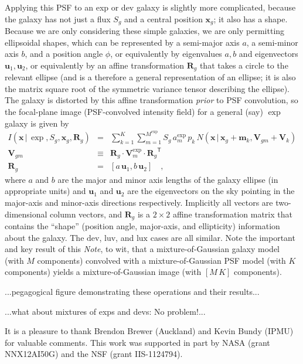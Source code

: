 \documentclass[12pt,pdftex,preprint]{aastex}
\newcommand{\documentname}{\textsl{Note}}
\newcommand{\tmatrix}[1]{\boldsymbol{#1}}
\newcommand{\transpose}[1]{{#1}^{\mathsf T}}
\newcommand{\tvector}[1]{\boldsymbol{#1}}
\newcommand{\pos}{\tvector{x}}
\newcommand{\mean}{\tvector{m}}
\newcommand{\var}{\tmatrix{V}}
\newcommand{\affine}{\tmatrix{R}}
\newcommand{\uv}{\tvector{u}}
\newcommand{\normal}{N}
\newcommand{\given}{\,|\,}
\newcommand{\dev}{\mathrm{dev}}
\newcommand{\lux}{\mathrm{lux}}
\newcommand{\luv}{\mathrm{luv}}
\begin{document}
Applying this PSF to an exp or dev galaxy is slightly more
complicated, because the galaxy has not just a flux $S_g$ and a
central position $\pos_g$; it also has a shape.  Because we are only
considering these simple galaxies, we are only permitting ellipsoidal
shapes, which can be represented by a semi-major axis $a$, a
semi-minor axis $b$, and a position angle $\phi$, or equivalently by
eigenvalues $a, b$ and eigenvectors $\uv_1, \uv_2$, or equivalently by
an affine transformation $\affine_g$ that takes a circle to the
relevant ellipse (and is a therefore a general representation of an
ellipse; it is also the matrix square root of the symmetric variance
tensor describing the ellipse).  The galaxy is distorted by this
affine transformation \emph{prior} to PSF convolution, so the
focal-plane image (PSF-convolved intensity field) for a general (say)
$\exp$ galaxy is given by
\begin{eqnarray}\displaystyle
I(\pos\given\exp,S_g,\pos_g,\affine_g) &=& \sum_{k=1}^K \sum_{m=1}^{M^{\exp}} S_g\,a^{\exp}_m\,p_k\,\normal(\pos\given\pos_g+\mean_k,\var_{gm}+\var_k)
\\
\var_{gm} &\equiv& \affine_g\cdot\var^{\exp}_m\cdot\transpose{\affine_g}
\\
\affine_g &=& \left[a\,\uv_1 , b\,\uv_2 \right]
\quad ,
\end{eqnarray}
where $a$ and $b$ are the major and minor axis lengths of the galaxy
ellipse (in appropriate units) and $\uv_1$ and $\uv_2$ are the
eigenvectors on the sky pointing in the major-axis and minor-axis
directions respectively.  Implicitly all vectors are two-dimensional
column vectors, and $\affine_g$ is a $2\times 2$ affine transformation
matrix that contains the ``shape'' (position angle, major-axis, and
ellipticity) information about the galaxy.  The $\dev$, $\luv$, and
$\lux$ cases are all similar.  Note the important and key result of
this \documentname, to wit, that a mixture-of-Gaussian galaxy model
(with $M$ components) convolved with a mixture-of-Gaussian PSF model
(with $K$ components) yields a mixture-of-Gaussian image (with
$[M\,K]$ components).

...pegagogical figure demonstrating these operations and their results...

...what about mixtures of exps and devs:  No problem!...

\acknowledgements It is a pleasure to thank
      Brendon Brewer (Auckland)
  and Kevin Bundy (IPMU)
for valuable comments.  This work was supported in part by NASA (grant
NNX12AI50G) and the NSF (grant IIS-1124794).
\end{document}
